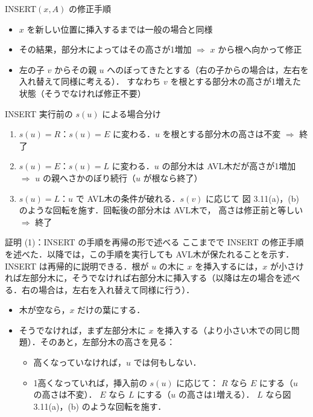\documentclass[aspectratio=169,11pt]{beamer}
\begin{document}
\begin{frame}{INSERT$(x,A)$ の修正手順}
  \begin{itemize}
    \item $x$ を新しい位置に挿入するまでは一般の場合と同様
    \item その結果，部分木によってはその高さが1増加 $\Rightarrow$ $x$ から根へ向かって修正
    \item 左の子 $v$ からその親 $u$ へのぼってきたとする（右の子からの場合は，左右を入れ替えて同様に考える）．
          すなわち $v$ を根とする部分木の高さが1増えた状態（そうでなければ修正不要）
  \end{itemize}
  \begin{block}{INSERT 実行前の $s(u)$ による場合分け}
    \begin{enumerate}
      \item $s(u)=R$：$s(u)=E$ に変わる．$u$ を根とする部分木の高さは不変 $\Rightarrow$ \alert{終了}
      \item $s(u)=E$：$s(u)=L$ に変わる．$u$ の部分木は AVL木だが高さが1増加
            $\Rightarrow$ $u$ の親へさかのぼり\alert{続行}（$u$ が根なら終了）
      \item $s(u)=L$：$u$ で AVL木の条件が破れる．$s(v)$ に応じて
            図 3.11(a)，(b) のような\alert{回転}を施す．回転後の部分木は AVL木で，
            高さは修正前と等しい $\Rightarrow$ \alert{終了}
    \end{enumerate}
  \end{block}
\end{frame}

\begin{frame}{証明 (1)：INSERT の手順を再帰の形で述べる}
  \footnotesize
  ここまでで INSERT の修正手順を述べた．以降では，この手順を実行しても AVL木が保たれることを示す．\\[2pt]
  INSERT は再帰的に説明できる．根が $u$ の木に $x$ を挿入するには，$x$ が小さければ左部分木に，そうでなければ右部分木に挿入する（以降は左の場合を述べる．右の場合は，左右を入れ替えて同様に行う）．
  \begin{itemize}
    \item 木が空なら，$x$ だけの葉にする．
    \item そうでなければ，まず左部分木に $x$ を挿入する（より小さい木での同じ問題）．そのあと，左部分木の高さを見る：
      \begin{itemize}
        \item 高くなっていなければ，$u$ では何もしない．
        \item 1高くなっていれば，挿入前の $s(u)$ に応じて：
          $R$ なら $E$ にする（$u$ の高さは不変）．
          $E$ なら $L$ にする（$u$ の高さは1増える）．
          $L$ なら図 3.11(a)，(b) のような回転を施す．
      \end{itemize}
  \end{itemize}
\end{frame}
\end{document}
